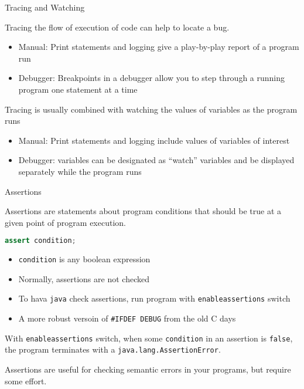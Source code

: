 \documentclass{beamer}
\begin{document}
\begin{frame}[fragile]{Tracing and Watching}


Tracing the flow of execution of code can help to locate a bug.
\begin{itemize}
\item Manual: Print statements and logging give a play-by-play report of a program run
\item Debugger: Breakpoints in a debugger allow you to step through a running program one statement at a time
\end{itemize}

Tracing is usually combined with watching the values of variables as the program runs
\begin{itemize}
\item Manual: Print statements and logging include values of variables of interest
\item Debugger: variables can be designated as ``watch'' variables and be displayed separately while the program runs
\end{itemize}


\end{frame}

\begin{frame}[fragile]{Assertions}


Assertions are statements about program conditions that should be true at a given point of program execution.
\begin{lstlisting}[language=Java]
assert condition;
\end{lstlisting}
\vspace{-.1in}
\begin{itemize}
\item {\tt condition} is any boolean expression
\item Normally, assertions are not checked
\item To hava {\tt java} check assertions, run program with {\tt enableassertions} switch
\item A more robust versoin of {\tt \#IFDEF DEBUG} from the old C days
\end{itemize}
With {\tt enableassertions} switch, when some {\tt condition} in an assertion is {\tt false}, the program terminates with a {\tt java.lang.AssertionError}.

\vspace{.1in}
Assertions are useful for checking semantic errors in your programs, but require some effort.


\end{frame}
\end{document}
